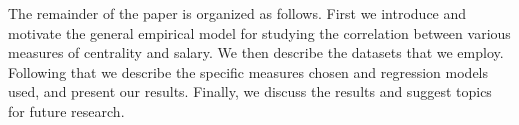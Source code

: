 The remainder of the paper is organized as follows. First we introduce and motivate the general empirical model for studying the correlation between various measures of centrality and salary. We then describe the datasets that we employ. Following that we describe the specific measures chosen and regression models used, and present our results. Finally, we discuss the results and suggest topics for future research.
